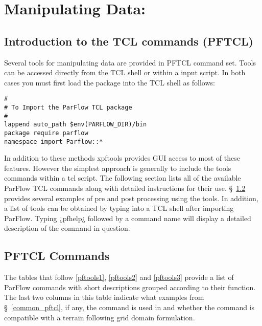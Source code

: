 
\chapter{Manipulating Data: \pftools{}}
\label{Manipulating Data}

\section{Introduction to the \parflow{} TCL commands (PFTCL) }
Several tools for manipulating data are provided in PFTCL command set. 
Tools can be accessed directly from the TCL shell or within a \parflow{} input script. 
In both cases you must first load the \parflow{} package into the TCL shell as follows: 


\begin{display}\begin{verbatim}
#
# To Import the ParFlow TCL package
#
lappend auto_path $env(PARFLOW_DIR)/bin 
package require parflow
namespace import Parflow::*
\end{verbatim}\end{display}

In addition to these methods xpftools provides GUI access to most of these features.  However
the simplest approach is generally to include the tools commands within a tcl script. The 
following section lists all of the available ParFlow TCL commands along with detailed instructions for their use.
\S~\ref{PFTCL Commands} provides several examples of pre and post processing using the tools.  In addition, a list of
tools can be obtained by typing  into a TCL shell after importing ParFlow. Typing ¿pfhelp¿ followed by a 
command name will display a detailed description of the command in question. 


\section{PFTCL Commands}
\label{PFTCL Commands}
The tables that follow \ref{pftools1}, \ref{pftools2} and \ref{pftools3} provide a list of ParFlow commands with short descriptions grouped according to their function. 
The last two columns in this table indicate what examples from \S~\ref{common_pftcl}, if any, the command is used in 
and whether the command is compatible with a terrain following grid domain formulation. 
\newpage


